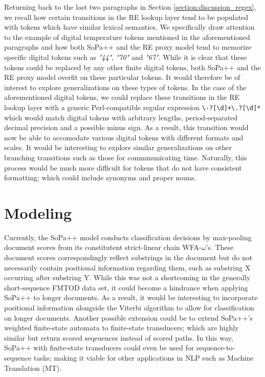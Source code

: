 Returning back to the last two paragraphs in Section
\ref{section:discussion_regex}, we recall how certain transitions in the RE
lookup layer tend to be populated with tokens which have similar lexical
semantics. We specifically draw attention to the example of digital temperature
tokens mentioned in the aforementioned paragraphs and how both SoPa++ and the RE
proxy model tend to memorize specific digital tokens such as \textit{"44"},
\textit{"70"} and \textit{"67"}. While it is clear that these tokens could be
replaced by any other finite digital tokens, both SoPa++ and the RE proxy model
overfit on these particular tokens. It would therefore be of interest to explore
generalizations on these types of tokens. In the case of the aforementioned
digital tokens, we could replace these transitions in the RE lookup layer with a
generic Perl-compatible regular expression
\texttt{\textbackslash-?[\textbackslash d]+\textbackslash .?[\textbackslash d]*}
which would match digital tokens with arbitrary lengths, period-separated
decimal precision and a possible minus sign. As a result, this transition would
now be able to accomodate various digital tokens with different formats and
scales. It would be interesting to explore similar generalizations on other
branching transitions such as those for commmunicating time. Naturally, this
process would be much more difficult for tokens that do not have consistent
formatting; which could include synonyms and proper nouns.

\section{Modeling}

Currently, the SoPa++ model conducts classification decisions by max-pooling
document scores from its constitutent strict-linear chain WFA-$\omega$'s. These
document scores correspondingly reflect substrings in the document but do not
necessarily contain positional information regarding them, such as substring
X occurring after substring Y. While this was not a shortcoming in the generally
short-sequence FMTOD data set, it could become a hindrance when applying SoPa++
to longer documents. As a result, it would be interesting to incorporate
positional information alongside the Viterbi algorithm to allow for
classification on longer documents. Another possible extension could be to
extend SoPa++'s weighted finite-state automata to finite-state transducers;
which are highly similar but return scored seqeuences instead of scored paths.
In this way, SoPa++ with finite-state transducers could even be used for
sequence-to-sequence tasks; making it viable for other applications in NLP such
as Machine Translation (MT).

